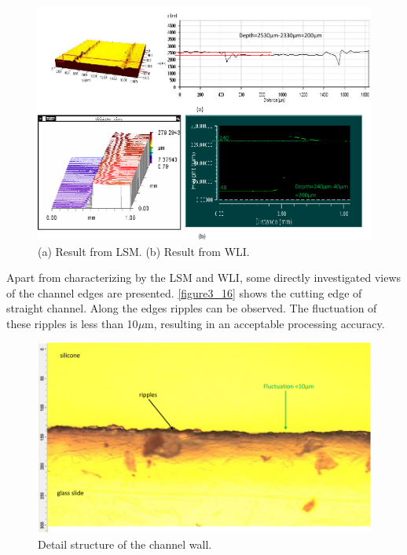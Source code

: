 \begin{figure}[ht]%
\centering
\includegraphics[width=1\textwidth]{figures/designandfabrication/figure3_15}%
\caption{(a) Result from LSM. (b) Result from WLI.}%
\label{figure3_15}%
\end{figure}

Apart from characterizing by the LSM and WLI, some directly investigated views of the channel edges are presented. \autoref{figure3_16} shows the cutting edge of straight channel. Along the edges ripples can be observed. The fluctuation of these ripples is less than 10$\mu$m, resulting in an acceptable processing accuracy.\\
\clearpage

\begin{figure}[ht]%
\centering
\includegraphics[width=1\textwidth]{figures/designandfabrication/figure3_16}%
\caption{Detail structure of the channel wall.}%
\label{figure3_16}%
\end{figure}

